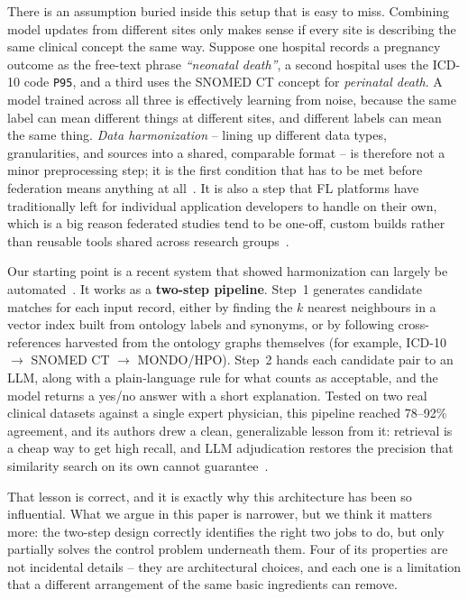 \documentclass[conference]{IEEEtran}
\begin{document}
There is an assumption buried inside this setup that is easy to miss. Combining model updates from different sites only makes sense if every site is describing the same clinical concept the same way. Suppose one hospital records a pregnancy outcome as the free-text phrase \emph{``neonatal death''}, a second hospital uses the ICD-10 code \texttt{P95}, and a third uses the SNOMED CT concept for \emph{perinatal death}. A model trained across all three is effectively learning from noise, because the same label can mean different things at different sites, and different labels can mean the same thing. \emph{Data harmonization} -- lining up different data types, granularities, and sources into a shared, comparable format -- is therefore not a minor preprocessing step; it is the first condition that has to be met before federation means anything at all~\cite{b42,b43}. It is also a step that FL platforms have traditionally left for individual application developers to handle on their own, which is a big reason federated studies tend to be one-off, custom builds rather than reusable tools shared across research groups~\cite{b1,b43}.

Our starting point is a recent system that showed harmonization can largely be automated~\cite{b1,b48}. It works as a \textbf{two-step pipeline}. Step~1 generates candidate matches for each input record, either by finding the $k$ nearest neighbours in a vector index built from ontology labels and synonyms, or by following cross-references harvested from the ontology graphs themselves (for example, ICD-10 $\rightarrow$ SNOMED CT $\rightarrow$ MONDO/HPO). Step~2 hands each candidate pair to an LLM, along with a plain-language rule for what counts as acceptable, and the model returns a yes/no answer with a short explanation. Tested on two real clinical datasets against a single expert physician, this pipeline reached 78--92\% agreement, and its authors drew a clean, generalizable lesson from it: retrieval is a cheap way to get high recall, and LLM adjudication restores the precision that similarity search on its own cannot guarantee~\cite{b1}.

That lesson is correct, and it is exactly why this architecture has been so influential. What we argue in this paper is narrower, but we think it matters more: the two-step design correctly identifies the right two jobs to do, but only partially solves the control problem underneath them. Four of its properties are not incidental details -- they are architectural choices, and each one is a limitation that a different arrangement of the same basic ingredients can remove.
\end{document}
